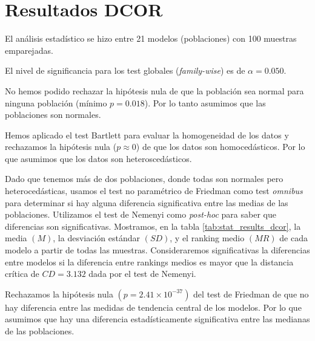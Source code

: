 \documentclass[a4paper,oneside,11pt,leqno]{article}
\begin{document}
	\section{Resultados DCOR}
	\label{sec:results_dcor}

	El análisis estadístico se hizo entre 21 modelos (poblaciones) con 100 muestras emparejadas.

	El nivel de significancia para los test globales (\textit{family-wise}) es de $\alpha=0.050$.

	No hemos podido rechazar la hipótesis nula de que la población sea normal para ninguna población (mínimo $p=0.018$). Por lo tanto asumimos que las poblaciones son normales.

	Hemos aplicado el test Bartlett para evaluar la homogeneidad de los datos y rechazamos la hipótesis nula ($p\approx 0$) de que los datos son homocedásticos. Por lo que asumimos que los datos son heteroscedásticos.

	Dado que tenemos más de dos poblaciones, donde todas son normales pero heterocedásticas, usamos el test no paramétrico de Friedman como test \textit{omnibus} para determinar si hay alguna diferencia significativa entre las medias de las poblaciones. Utilizamos el test de Nemenyi como \textit{post-hoc} para saber que diferencias son significativas. Mostramos, en la tabla \ref{tab:stat_results_dcor}, la media $(M)$, la desviación estándar $(SD)$, y el ranking medio $(MR)$ de cada modelo a partir de todas las muestras. Consideraremos significativas la diferencias entre modelos si la diferencia entre rankings medios es mayor que la distancia crítica de $CD=3.132$ dada por el test de Nemenyi.

	Rechazamos la hipótesis nula $(p=2.41\times 10^{-37})$ del test de Friedman de que no hay diferencia entre las medidas de tendencia central de los modelos. Por lo que asumimos que hay una diferencia estadísticamente significativa entre las medianas de las poblaciones.
\end{document}
